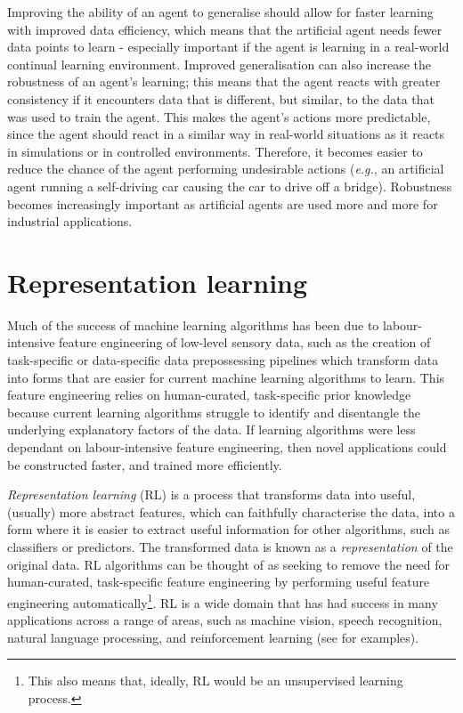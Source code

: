 Improving the ability of an agent to generalise should allow for faster learning with improved data efficiency, which means that the artificial agent needs fewer data points to learn - especially important if the agent is learning in a real-world continual learning environment.
Improved generalisation can also increase the robustness of an agent's learning; this means that the agent reacts with greater consistency if it encounters data that is different, but similar, to the data that was used to train the agent.
This makes the agent's actions more predictable, since the agent should react in a similar way in real-world situations as it reacts in simulations or in controlled environments.
Therefore, it becomes easier to reduce the chance of the agent performing undesirable actions (\textit{e.g.}, an artificial agent running a self-driving car causing the car to drive off a bridge).
Robustness becomes increasingly important as artificial agents are used more and more for industrial applications.

\section{Representation learning}

Much of the success of machine learning algorithms has been due to labour-intensive feature engineering of low-level sensory data, such as the creation of task-specific or data-specific data prepossessing pipelines which transform data into forms that are easier for current machine learning algorithms to learn.
This feature engineering relies on human-curated, task-specific prior knowledge because current learning algorithms struggle to identify and disentangle the underlying explanatory factors of the data.
If learning algorithms were less dependant on labour-intensive feature engineering, then novel applications could be constructed faster, and trained more efficiently.

\textit{Representation learning} (RL) is a process that transforms data into useful, (usually) more abstract features, which can faithfully characterise the data, into a form where it is easier to extract useful information for other algorithms, such as classifiers or predictors.
The transformed data is known as a \textit{representation} of the original data.
RL algorithms can be thought of as seeking to remove the need for human-curated, task-specific feature engineering by performing useful feature engineering automatically\footnote{This also means that, ideally, RL would be an unsupervised learning process.}.
RL is a wide domain that has had success in many applications across a range of areas, such as machine vision, speech recognition, natural language processing, and reinforcement learning (see \autocite{Bengio2013} for examples).

